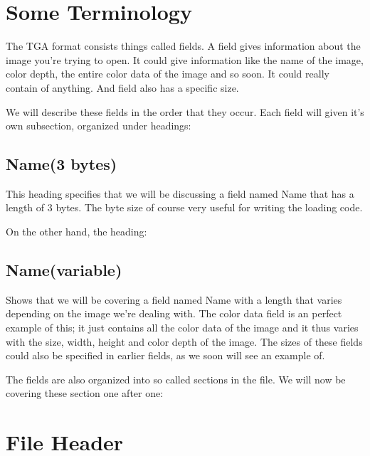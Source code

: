 \begin{refsection}
  \section{Some Terminology}

  The TGA format consists things called fields. A field
  gives information about the image you're trying to open. It could
  give information like the name of the image, color depth, the entire color data
  of the image and so soon. It could really contain of anything. And
  field also has a specific size.

  \newcommand{\plural}[3]{\ifstrequal{#1}{1}{#2}{#3}}
  \newcommand{\fieldlength}[1]{\ifstrequal{#1}{0}{variable}{#1 \plural{#1}{byte}{bytes}}}
  \newcommand{\imgfield}[2]{\subsection*{#1(\fieldlength{#2})}}
  \newcommand{\imgsubfield}[2]{\subsubsection*{#1(\fieldlength{#2})}}

  We will describe these fields in the order that they occur. Each
  field will given it's own subsection, organized under headings:

  \imgfield{Name}{3}

  This heading specifies that we will be discussing a field named Name
  that has a length of 3 bytes. The byte size of course very useful
  for writing the loading code.

  On the other hand, the heading:

  \imgfield{Name}{0}

  Shows that we will be covering a field named Name with a length that
  varies depending on the image we're dealing with. The color data
  field is an perfect example of this; it just contains all the color
  data of the image and it thus varies with the size, width, height
  and color depth of the image. The sizes of these fields could also
  be specified in earlier fields, as we soon will see an example of.

  The fields are also organized into so called sections in the
  file. We will now be covering these section one after one:

  \section{File Header}


\end{refsection}
